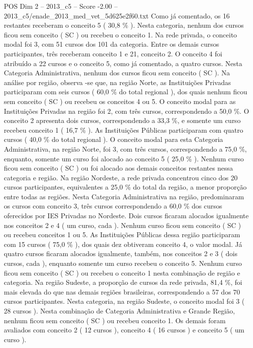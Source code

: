 \begin{textsample}{POS Dim 2 – 2013\_c5 – Score -2.00 – 2013\_c5/enade\_2013\_med\_vet\_5d625e2f60.txt}
Como já comentado, os 16 restantes receberam o conceito 5 ( 30,8 \% ).
Nesta categoria, nenhum dos cursos ficou sem conceito ( SC ) ou recebeu o conceito 1.
Na rede privada, o conceito modal foi 3, com 51 cursos dos 101 da categoria.
Entre os demais cursos participantes, três receberam conceito 1 e 21, conceito 2.
O conceito 4 foi atribuído a 22 cursos e o conceito 5, como já comentado, a quatro cursos.
Nesta Categoria Administrativa, nenhum dos cursos ficou sem conceito ( SC ).
Na análise por região, observa -se que, na região Norte, as Instituições Privadas participaram com seis cursos ( 60,0 \% do total regional ), dos quais nenhum ficou sem conceito ( SC ) ou recebeu os conceitos 4 ou 5.
O conceito modal para as Instituições Privadas na região foi 2, com três cursos, correspondendo a 50,0 \%.
O conceito 2 apresenta dois cursos, correspondendo a 33,3 \%, e somente um curso recebeu conceito 1 ( 16,7 \% ).
As Instituições Públicas participaram com quatro cursos ( 40,0 \% do total regional ).
O conceito modal para esta Categoria Administrativa, na região Norte, foi 3, com três cursos, correspondendo a 75,0 \%, enquanto, somente um curso foi alocado ao conceito 5 ( 25,0 \% ).
Nenhum curso ficou sem conceito ( SC ) ou foi alocado aos demais conceitos restantes nessa categoria e região.
Na região Nordeste, a rede privada concentrou cinco dos 20 cursos participantes, equivalentes a 25,0 \% do total da região, a menor proporção entre todas as regiões.
Nesta Categoria Administrativa na região, predominaram os cursos com conceito 3, três cursos correspondendo a 60,0 \% dos cursos oferecidos por IES Privadas no Nordeste.
Dois cursos ficaram alocados igualmente nos conceitos 2 e 4 ( um curso, cada ).
Nenhum curso ficou sem conceito ( SC ) ou recebeu conceitos 1 ou 5.
As Instituições Públicas dessa região participaram com 15 cursos ( 75,0 \% ), dos quais dez obtiveram conceito 4, o valor modal.
Já quatro cursos ficaram alocados igualmente, também, nos conceitos 2 e 3 ( dois cursos, cada ), enquanto somente um curso recebeu o conceito 5.
Nenhum curso ficou sem conceito ( SC ) ou recebeu o conceito 1 nesta combinação de região e categoria.
Na região Sudeste, a proporção de cursos da rede privada, 81,4 \%, foi mais elevada do que nas demais regiões brasileiras, correspondendo a 57 dos 70 cursos participantes.
Nesta categoria, na região Sudeste, o conceito modal foi 3 ( 28 cursos ).
Nesta combinação de Categoria Administrativa e Grande Região, nenhum ficou sem conceito ( SC ) ou recebeu conceito 1.
Os demais foram avaliados com conceito 2 ( 12 cursos ), conceito 4 ( 16 cursos ) e conceito 5 ( um curso ).

\end{textsample}
